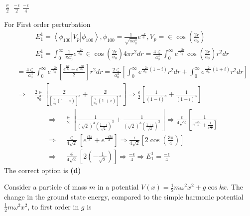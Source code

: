 \begin{enumerate}
\begin{tasks}
	\task[\textbf{B.}] $\frac{\in}{2}$
	\task[\textbf{C.}]$\frac{-\epsilon}{2}$
	\task[\textbf{D.}] $\frac{-\epsilon}{4}$
\end{tasks}
\begin{answer}
	For First order perturbation\\
	$$\begin{aligned}
	&E_{1}^{1}=\left\langle\phi_{100}\left|V_{p}\right| \phi_{100}\right\rangle, \phi_{100}=\frac{1}{\sqrt{\pi a_{0}^{3}}} e^{\frac{-r}{a}}, V_{p}=\in \cos \left(\frac{2 r}{a_{0}}\right) \\
	&E_{1}^{1}=\int_{0}^{\infty} \frac{1}{\pi a_{0}^{3}} e^{\frac{-2 r}{a_{0}}} \in \cos \left(\frac{2 r}{a_{0}}\right) 4 \pi r^{2} d r=\frac{4 \in}{a_{0}^{3}} \int_{0}^{\infty} e^{\frac{-2 r}{a_{0}}} \cos \left(\frac{2 r}{a_{0}}\right) r^{2} d r
	\end{aligned}$$
	$$\begin{aligned}
	&=\frac{4 \in}{a_{0}^{3}} \int_{0}^{\infty} e^{\frac{-2 r}{a_{0}}}\left[\frac{e^{\frac{i 2 r}{a_{0}}}+e^{\frac{-i 2 r}{a_{0}}}}{2}\right] r^{2} d r=\frac{2 \in}{a_{0}^{3}}\left[\int_{0}^{\infty} e^{\frac{-2 r}{a_{0}}(1-i)} r^{2} d r+\int_{0}^{\infty} e^{\frac{-2 r}{a_{0}}(1+i)} r^{2} d r\right] \\
	&\Rightarrow \quad \frac{2 \in}{a_{0}^{3}}\left[\frac{2 !}{\left[\frac{2}{a_{0}}(1-i)\right]^{3}}+\frac{2 !}{\left[\frac{2}{a_{0}}(1+i)\right]^{3}}\right] \Rightarrow \frac{\epsilon}{2}\left[\frac{1}{(1-i)^{3}}+\frac{1}{(1+i)^{3}}\right]
	\end{aligned}$$
	$$\begin{aligned}
	&\Rightarrow \quad \frac{\in}{2}\left[\frac{1}{(\sqrt{2})^{3}\left(\frac{1-i}{\sqrt{2}}\right)^{3}}+\frac{1}{(\sqrt{2})^{3}\left(\frac{1+i}{\sqrt{2}}\right)^{3}}\right] \Rightarrow \frac{\epsilon}{4 \sqrt{2}}\left[\frac{1}{\left.e^{\frac{-i 3 \pi}{4}}+\frac{1}{e^{\frac{i 3 \pi}{4}}}\right]}\right. \\
	&\Rightarrow \quad \frac{\in}{4 \sqrt{2}}\left[e^{\frac{i 3 \pi}{4}}+e^{\frac{-i 3 \pi}{4}}\right] \Rightarrow \frac{\epsilon}{4 \sqrt{2}}\left[2 \cos \left(\frac{3 \pi}{4}\right)\right] \\
	&\Rightarrow \quad \frac{\in}{4 \sqrt{2}}\left[2\left(-\frac{1}{\sqrt{2}}\right)\right] \Rightarrow \frac{-\epsilon}{4} \Rightarrow E_{1}^{1}=\frac{-\epsilon}{4}
	\end{aligned}$$
	The correct option is \textbf{(d)}
\end{answer}
\begin{minipage}{\textwidth}
	\item Consider a particle of mass $m$ in a potential $V(x)=\frac{1}{2} m \omega^{2} x^{2}+g \cos k x .$ The change in the ground state energy, compared to the simple harmonic potential $\frac{1}{2} m \omega^{2} x^{2}$, to first order in $g$ is

\end{minipage}
\end{enumerate}
